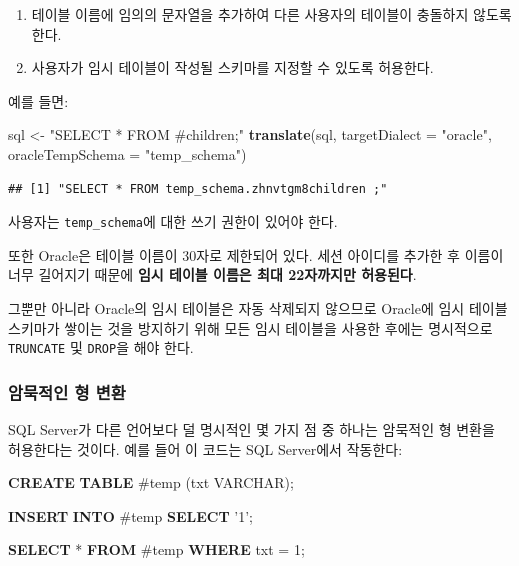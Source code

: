 \documentclass[10.5pt]{book}
\newenvironment{Shaded}{\begin{snugshade}}{\end{snugshade}}
\newcommand{\KeywordTok}[1]{\textcolor[rgb]{0.13,0.29,0.53}{\textbf{#1}}}
\newcommand{\DataTypeTok}[1]{\textcolor[rgb]{0.13,0.29,0.53}{#1}}
\newcommand{\DecValTok}[1]{\textcolor[rgb]{0.00,0.00,0.81}{#1}}
\newcommand{\StringTok}[1]{\textcolor[rgb]{0.31,0.60,0.02}{#1}}
\newcommand{\NormalTok}[1]{#1}
\providecommand{\tightlist}{%
  \setlength{\itemsep}{0pt}\setlength{\parskip}{0pt}}
\theoremstyle{definition}
\theoremstyle{definition}
\theoremstyle{definition}
\theoremstyle{remark}
\begin{document}
\begin{enumerate}
\def\labelenumi{\arabic{enumi}.}
\tightlist
\item
  테이블 이름에 임의의 문자열을 추가하여 다른 사용자의 테이블이 충돌하지
  않도록 한다.
\item
  사용자가 임시 테이블이 작성될 스키마를 지정할 수 있도록 허용한다.
\end{enumerate}

예를 들면:

\begin{Shaded}
\begin{Highlighting}[]
\NormalTok{sql <-}\StringTok{ "SELECT * FROM #children;"}
\KeywordTok{translate}\NormalTok{(sql, }\DataTypeTok{targetDialect =} \StringTok{"oracle"}\NormalTok{, }\DataTypeTok{oracleTempSchema =} \StringTok{"temp_schema"}\NormalTok{)}
\end{Highlighting}
\end{Shaded}

\begin{verbatim}
## [1] "SELECT * FROM temp_schema.zhnvtgm8children ;"
\end{verbatim}

사용자는 \texttt{temp\_schema}에 대한 쓰기 권한이 있어야 한다.

또한 Oracle은 테이블 이름이 30자로 제한되어 있다. 세션 아이디를 추가한
후 이름이 너무 길어지기 때문에 \textbf{임시 테이블 이름은 최대
22자까지만 허용된다}.

그뿐만 아니라 Oracle의 임시 테이블은 자동 삭제되지 않으므로 Oracle에
임시 테이블 스키마가 쌓이는 것을 방지하기 위해 모든 임시 테이블을 사용한
후에는 명시적으로 \texttt{TRUNCATE} 및 \texttt{DROP}을 해야 한다.

\subsubsection*{암묵적인 형 변환}\label{--}

SQL Server가 다른 언어보다 덜 명시적인 몇 가지 점 중 하나는 암묵적인 형
변환을 허용한다는 것이다. 예를 들어 이 코드는 SQL Server에서 작동한다:

\begin{Shaded}
\begin{Highlighting}[]
\KeywordTok{CREATE} \KeywordTok{TABLE}\NormalTok{ #temp (txt }\DataTypeTok{VARCHAR}\NormalTok{);}

\KeywordTok{INSERT} \KeywordTok{INTO}\NormalTok{ #temp}
\KeywordTok{SELECT} \StringTok{'1'}\NormalTok{;}

\KeywordTok{SELECT}\NormalTok{ * }\KeywordTok{FROM}\NormalTok{ #temp }\KeywordTok{WHERE}\NormalTok{ txt = }\DecValTok{1}\NormalTok{;}
\end{Highlighting}
\end{Shaded}
\end{document}
